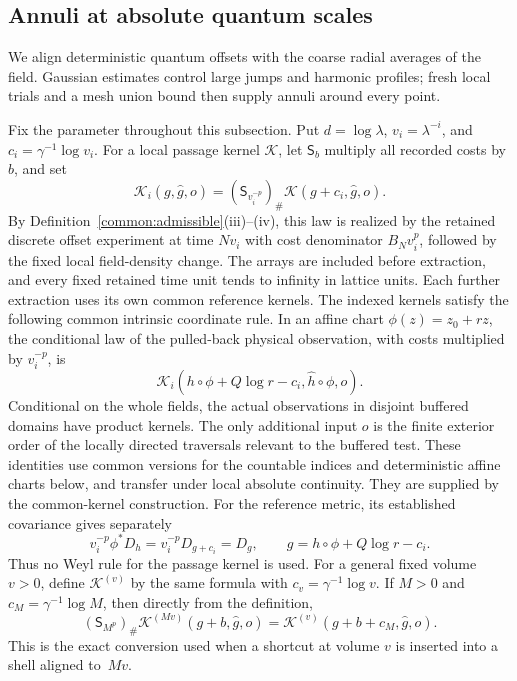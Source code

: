 \subsection{Annuli at absolute quantum scales}

We align deterministic quantum offsets with the coarse radial averages
of the field.  Gaussian estimates control large jumps and harmonic
profiles; fresh local trials and a mesh union bound then supply annuli
around every point.

Fix the parameter throughout this subsection.  Put $d=\log\lambda$,
$v_i=\lambda^{-i}$, and $c_i=\gamma^{-1}\log v_i$.
For a local passage kernel $\mathcal K$, let $\mathsf S_b$ multiply all
recorded costs by $b$, and set
\begin{equation}\label{comp:ann-index-definition}
 \mathcal K_i(g,\widehat g,o)
   =(\mathsf S_{v_i^{-p}})_\#\mathcal K(g+c_i,\widehat g,o).
\end{equation}
By Definition~\ref{common:admissible}(iii)--(iv), this law is realized
by the retained discrete offset experiment at time $Nv_i$ with cost
denominator $B_Nv_i^p$, followed by the fixed local field-density
change.  The arrays are included before extraction, and every fixed
retained time unit tends to infinity in lattice units.  Each further
extraction uses its own common reference kernels.  The indexed kernels satisfy the
following common intrinsic coordinate rule.  In an affine chart
$\phi(z)=z_0+rz$, the conditional law of the pulled-back physical
observation, with costs multiplied by $v_i^{-p}$, is
\[
 \mathcal K_i(h\circ\phi+Q\log r-c_i,
              \widehat h\circ\phi,o).
\]
Conditional on the whole fields, the actual observations in disjoint
buffered domains have product kernels.  The only additional input $o$ is
the finite exterior order of the locally directed traversals relevant to
the buffered test.  These identities use common versions for the countable
indices and deterministic affine charts below, and transfer under local
absolute continuity.  They are supplied by the common-kernel construction.
For the reference metric, its established covariance gives separately
\begin{equation}\label{comp:ann-reference-scaling}
 v_i^{-p}\phi^*D_h
   =v_i^{-p}D_{g+c_i}=D_g,
 \qquad g=h\circ\phi+Q\log r-c_i.
\end{equation}
Thus no Weyl rule for the passage kernel is used.
For a general fixed volume $v>0$, define $\mathcal K^{(v)}$
by the same formula with $c_v=\gamma^{-1}\log v$.
If $M>0$ and $c_M=\gamma^{-1}\log M$, then directly from
the definition,
\begin{equation}\label{comp:ann-two-units}
 (\mathsf S_{M^p})_\#\mathcal K^{(Mv)}(g+b,\widehat g,o)
 =\mathcal K^{(v)}(g+b+c_M,\widehat g,o).
\end{equation}
This is the exact conversion used when a shortcut at volume $v$
is inserted into a shell aligned to~$Mv$.

